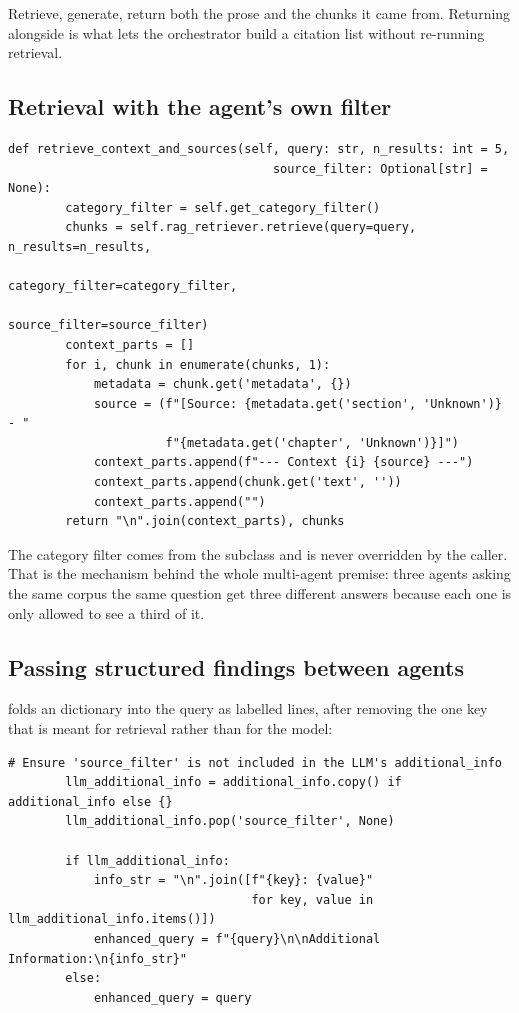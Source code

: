 Retrieve, generate, return both the prose and the chunks it came from. Returning  alongside  is what lets the orchestrator build a citation list without re-running retrieval.

\subsection{Retrieval with the agent's own filter}

\begin{lstlisting}[style=py,firstnumber=21]
    def retrieve_context_and_sources(self, query: str, n_results: int = 5,
                                     source_filter: Optional[str] = None):
        category_filter = self.get_category_filter()
        chunks = self.rag_retriever.retrieve(query=query, n_results=n_results,
                                             category_filter=category_filter,
                                             source_filter=source_filter)
        context_parts = []
        for i, chunk in enumerate(chunks, 1):
            metadata = chunk.get('metadata', {})
            source = (f"[Source: {metadata.get('section', 'Unknown')} - "
                      f"{metadata.get('chapter', 'Unknown')}]")
            context_parts.append(f"--- Context {i} {source} ---")
            context_parts.append(chunk.get('text', ''))
            context_parts.append("")
        return "\n".join(context_parts), chunks
\end{lstlisting}

The category filter comes from the subclass and is never overridden by the caller. That is the mechanism behind the whole multi-agent premise: three agents asking the same corpus the same question get three different answers because each one is only allowed to see a third of it.

\subsection{Passing structured findings between agents}

 folds an  dictionary into the query as labelled lines, after removing the one key that is meant for retrieval rather than for the model:

\begin{lstlisting}[style=py,firstnumber=43]
        # Ensure 'source_filter' is not included in the LLM's additional_info
        llm_additional_info = additional_info.copy() if additional_info else {}
        llm_additional_info.pop('source_filter', None)

        if llm_additional_info:
            info_str = "\n".join([f"{key}: {value}"
                                  for key, value in llm_additional_info.items()])
            enhanced_query = f"{query}\n\nAdditional Information:\n{info_str}"
        else:
            enhanced_query = query
\end{lstlisting}

